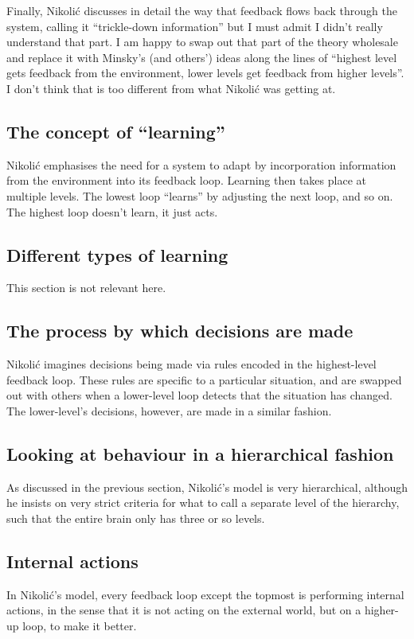 \documentclass[10pt,a4paper]{article}
\newcommand{\nquote}[1]{``{#1}''}
\begin{document}
Finally, Nikoli{\'c} discusses in detail the way that feedback flows back through the system, calling it \nquote{trickle-down information} but I must admit I didn't really understand that part. I am happy to swap out that part of the theory wholesale and replace it with Minsky's (and others') ideas along the lines of \nquote{highest level gets feedback from the environment, lower levels get feedback from higher levels}. I don't think that is too different from what Nikoli{\'c} was getting at.

\subsection{The concept of \nquote{learning}}
Nikoli{\'c} emphasises the need for a system to adapt by incorporation information from the environment into its feedback loop. Learning then takes place at multiple levels. The lowest loop \nquote{learns} by adjusting the next loop, and so on. The highest loop doesn't learn, it just acts.

\subsection{Different types of learning}
This section is not relevant here.

\subsection{The process by which decisions are made}
Nikoli{\'c} imagines decisions being made via rules encoded in the highest-level feedback loop. These rules are specific to a particular situation, and are swapped out with others when a lower-level loop detects that the situation has changed. The lower-level's decisions, however, are made in a similar fashion.

\subsection{Looking at behaviour in a hierarchical fashion}
As discussed in the previous section, Nikoli{\'c}'s model is very hierarchical, although he insists on very strict criteria for what to call a separate level of the hierarchy, such that the entire brain only has three or so levels.

\subsection{Internal actions}
In Nikoli{\'c}'s model, every feedback loop except the topmost is performing internal actions, in the sense that it is not acting on the external world, but on a higher-up loop, to make it better.
\end{document}
